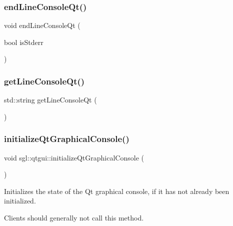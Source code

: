 \subsubsection{\texorpdfstring{end\+Line\+Console\+Qt()}{endLineConsoleQt()}}
{\footnotesize\ttfamily void end\+Line\+Console\+Qt (\begin{DoxyParamCaption}\item[{bool}]{is\+Stderr }\end{DoxyParamCaption})}

\mbox{\label{namespacesgl_1_1qtgui_ac9d3e41f643b89ff2ecbe0afc84072af}} 
\subsubsection{\texorpdfstring{get\+Line\+Console\+Qt()}{getLineConsoleQt()}}
{\footnotesize\ttfamily std\+::string get\+Line\+Console\+Qt (\begin{DoxyParamCaption}{ }\end{DoxyParamCaption})}

\mbox{\label{namespacesgl_1_1qtgui_af114a24639056b7e4d4494427a9613f3}} 
\subsubsection{\texorpdfstring{initialize\+Qt\+Graphical\+Console()}{initializeQtGraphicalConsole()}}
{\footnotesize\ttfamily void sgl\+::qtgui\+::initialize\+Qt\+Graphical\+Console (\begin{DoxyParamCaption}{ }\end{DoxyParamCaption})}



Initializes the state of the Qt graphical console, if it has not already been initialized. 

Clients should generally not call this method. \mbox{\label{namespacesgl_1_1qtgui_a25ce060b47ba94ee61147714f19c1764}} 
